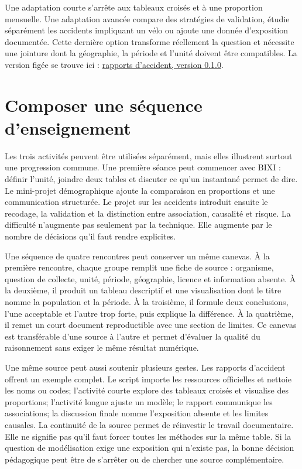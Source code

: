 Une adaptation courte s'arrête aux tableaux croisés et à une proportion mensuelle. Une adaptation avancée compare des stratégies de validation, étudie séparément les accidents impliquant un vélo ou ajoute une donnée d'exposition documentée. Cette dernière option transforme réellement la question et nécessite une jointure dont la géographie, la période et l'unité doivent être compatibles. La version figée se trouve ici : \href{https://github.com/AurelienNicosiaULaval/donnees-bleues/blob/v0.1.0/datasets/rapports-accident/activite-longue.qmd}{rapports d'accident, version 0.1.0}.

\section{Composer une séquence d'enseignement}

Les trois activités peuvent être utilisées séparément, mais elles illustrent surtout une progression commune. Une première séance peut commencer avec BIXI : définir l'unité, joindre deux tables et discuter ce qu'un instantané permet de dire. Le mini-projet démographique ajoute la comparaison en proportions et une communication structurée. Le projet sur les accidents introduit ensuite le recodage, la validation et la distinction entre association, causalité et risque. La difficulté n'augmente pas seulement par la technique. Elle augmente par le nombre de décisions qu'il faut rendre explicites.

Une séquence de quatre rencontres peut conserver un même canevas. À la première rencontre, chaque groupe remplit une fiche de source : organisme, question de collecte, unité, période, géographie, licence et information absente. À la deuxième, il produit un tableau descriptif et une visualisation dont le titre nomme la population et la période. À la troisième, il formule deux conclusions, l'une acceptable et l'autre trop forte, puis explique la différence. À la quatrième, il remet un court document reproductible avec une section de limites. Ce canevas est transférable d'une source à l'autre et permet d'évaluer la qualité du raisonnement sans exiger le même résultat numérique.

Une même source peut aussi soutenir plusieurs gestes. Les rapports d'accident offrent un exemple complet. Le script importe les ressources officielles et nettoie les noms ou codes; l'activité courte explore des tableaux croisés et visualise des proportions; l'activité longue ajuste un modèle; le rapport communique les associations; la discussion finale nomme l'exposition absente et les limites causales. La continuité de la source permet de réinvestir le travail documentaire. Elle ne signifie pas qu'il faut forcer toutes les méthodes sur la même table. Si la question de modélisation exige une exposition qui n'existe pas, la bonne décision pédagogique peut être de s'arrêter ou de chercher une source complémentaire.

